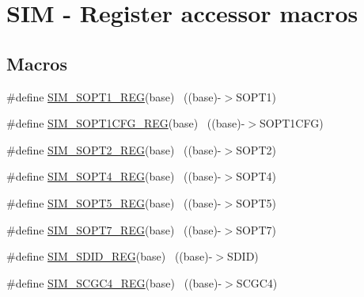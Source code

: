 \hypertarget{group___s_i_m___register___accessor___macros}{}\section{S\+IM -\/ Register accessor macros}
\label{group___s_i_m___register___accessor___macros}
\subsection*{Macros}
\begin{DoxyCompactItemize}
\item 
\#define \hyperlink{group___s_i_m___register___accessor___macros_ga4fb13e9e7e8bf019daf19284be9b0a73}{S\+I\+M\+\_\+\+S\+O\+P\+T1\+\_\+\+R\+EG}(base)                                        ~((base)-\/$>$S\+O\+P\+T1)
\item 
\#define \hyperlink{group___s_i_m___register___accessor___macros_ga2eac749528469c06ed7ac6d54070fdbd}{S\+I\+M\+\_\+\+S\+O\+P\+T1\+C\+F\+G\+\_\+\+R\+EG}(base)                                  ~((base)-\/$>$S\+O\+P\+T1\+C\+FG)
\item 
\#define \hyperlink{group___s_i_m___register___accessor___macros_ga94d1a56cbf8d6fbebbd00363ce3cd130}{S\+I\+M\+\_\+\+S\+O\+P\+T2\+\_\+\+R\+EG}(base)                                        ~((base)-\/$>$S\+O\+P\+T2)
\item 
\#define \hyperlink{group___s_i_m___register___accessor___macros_gae47c458103d1381ff7b7f25e45338a64}{S\+I\+M\+\_\+\+S\+O\+P\+T4\+\_\+\+R\+EG}(base)                                        ~((base)-\/$>$S\+O\+P\+T4)
\item 
\#define \hyperlink{group___s_i_m___register___accessor___macros_ga969ab1c02ed173435da69034770b467e}{S\+I\+M\+\_\+\+S\+O\+P\+T5\+\_\+\+R\+EG}(base)                                        ~((base)-\/$>$S\+O\+P\+T5)
\item 
\#define \hyperlink{group___s_i_m___register___accessor___macros_gadd45a86c03d150e9641a354840a71443}{S\+I\+M\+\_\+\+S\+O\+P\+T7\+\_\+\+R\+EG}(base)                                        ~((base)-\/$>$S\+O\+P\+T7)
\item 
\#define \hyperlink{group___s_i_m___register___accessor___macros_gad1b6e604a7db5ffcbe8c3e16d85c8e6b}{S\+I\+M\+\_\+\+S\+D\+I\+D\+\_\+\+R\+EG}(base)                                          ~((base)-\/$>$S\+D\+ID)
\item 
\#define \hyperlink{group___s_i_m___register___accessor___macros_gab863740854e0a595d5d450e533ded630}{S\+I\+M\+\_\+\+S\+C\+G\+C4\+\_\+\+R\+EG}(base)                                        ~((base)-\/$>$S\+C\+G\+C4)

\end{DoxyCompactItemize}
